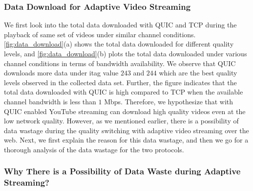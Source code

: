 \subsubsection{Data Download for Adaptive Video Streaming}
We first look into the total data downloaded with QUIC and TCP during the playback of same set of videos under similar channel conditions. \fig\ref{fig:data_download}(a) shows the total data downloaded for different quality levels, and \fig\ref{fig:data_download}(b) plots the total data downloaded under various channel conditions in terms of bandwidth availability. We observe that QUIC downloads more data under itag value $243$ and $244$ which are the best quality levels observed in the collected data set. 
Further, the figure indicates that the total data downloaded with QUIC is high compared to TCP when the available channel bandwidth is less than $1$ Mbps. Therefore, we hypothesize that with QUIC enabled YouTube streaming can download high quality videos even at the low network quality. 
However, as we mentioned earlier, there is a possibility of data wastage during the quality switching with adaptive video streaming over the web. Next, we first explain the reason for this data wastage, and then we go for a thorough analysis of the data wastage for the two protocols. 





\subsubsection{Why There is a Possibility of Data Waste during Adaptive Streaming?}


